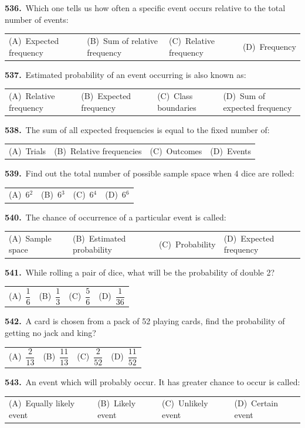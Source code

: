 \documentclass[11pt,a4paper]{article}
\makeatletter
\newcommand{\mcq}[6]{%
  \Needspace{4\baselineskip}%
  \par\medskip\noindent\textbf{#1.}\ #2\par\nopagebreak
  \noindent\begin{tabularx}{\linewidth}{@{\hspace{1.5em}}*{4}{>{\raggedright\arraybackslash}X}@{}}
    (A)~#3 & (B)~#4 & (C)~#5 & (D)~#6
  \end{tabularx}\par}
\makeatother
\begin{document}
\mcq{536}{Which one tells us how often a specific event occurs relative to the total number of events:}{Expected frequency}{Sum of relative frequency}{Relative frequency}{Frequency}
\mcq{537}{Estimated probability of an event occurring is also known as:}{Relative frequency}{Expected frequency}{Class boundaries}{Sum of expected frequency}
\mcq{538}{The sum of all expected frequencies is equal to the fixed number of:}{Trials}{Relative frequencies}{Outcomes}{Events}
\mcq{539}{Find out the total number of possible sample space when 4 dice are rolled:}{6$^{2}$}{6$^{3}$}{6$^{4}$}{6$^{6}$}
\mcq{540}{The chance of occurrence of a particular event is called:}{Sample space}{Estimated probability}{Probability}{Expected frequency}
\mcq{541}{While rolling a pair of dice, what will be the probability of double 2?}{$\dfrac{1}{6}$}{$\dfrac{1}{3}$}{$\dfrac{5}{6}$}{$\dfrac{1}{36}$}
\mcq{542}{A card is chosen from a pack of 52 playing cards, find the probability of getting no jack and king?}{$\dfrac{2}{13}$}{$\dfrac{11}{13}$}{$\dfrac{2}{52}$}{$\dfrac{11}{52}$}
\mcq{543}{An event which will probably occur. It has greater chance to occur is called:}{Equally likely event}{Likely event}{Unlikely event}{Certain event}
\end{document}
